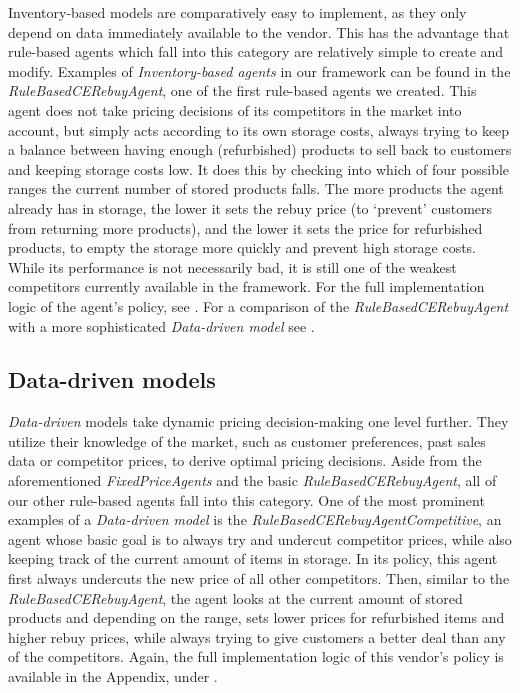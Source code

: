 Inventory-based models are comparatively easy to implement, as they only depend on data immediately available to the vendor. This has the advantage that rule-based agents which fall into this category are relatively simple to create and modify. Examples of \emph{Inventory-based agents} in our framework can be found in the \emph{RuleBasedCERebuyAgent}, one of the first rule-based agents we created. This agent does not take pricing decisions of its competitors in the market into account, but simply acts according to its own storage costs, always trying to keep a balance between having enough (refurbished) products to sell back to customers and keeping storage costs low. It does this by checking into which of four possible ranges the current number of stored products falls. The more products the agent already has in storage, the lower it sets the rebuy price (to `prevent' customers from returning more products), and the lower it sets the price for refurbished products, to empty the storage more quickly and prevent high storage costs. While its performance is not necessarily bad, it is still one of the weakest competitors currently available in the framework. For the full implementation logic of the agent's policy, see . For a comparison of the \emph{RuleBasedCERebuyAgent} with a more sophisticated \emph{Data-driven model} see .

\subsection{Data-driven models}\label{subsec:DataDrivenModels}

\emph{Data-driven} models take dynamic pricing decision-making one level further. They utilize their knowledge of the market, such as customer preferences, past sales data or competitor prices, to derive optimal pricing decisions. Aside from the aforementioned \emph{FixedPriceAgents} and the basic \emph{RuleBasedCERebuyAgent}, all of our other rule-based agents fall into this category. One of the most prominent examples of a \emph{Data-driven model} is the \emph{RuleBasedCERebuyAgentCompetitive}, an agent whose basic goal is to always try and undercut competitor prices, while also keeping track of the current amount of items in storage. In its policy, this agent first always undercuts the new price of all other competitors. Then, similar to the \emph{RuleBasedCERebuyAgent}, the agent looks at the current amount of stored products and depending on the range, sets lower prices for refurbished items and higher rebuy prices, while always trying to give customers a better deal than any of the competitors. Again, the full implementation logic of this vendor's policy is available in the Appendix, under .

